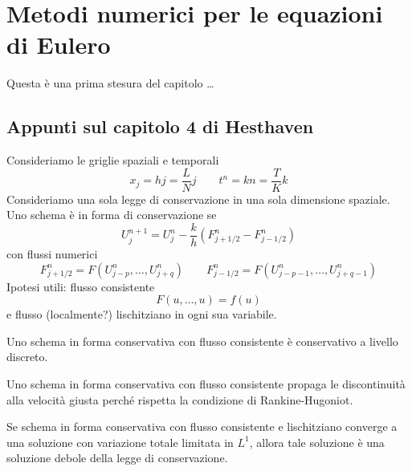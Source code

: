 \chapter{Metodi numerici per le equazioni di Eulero}

Questa è una prima stesura del capitolo \dots

\section{Appunti sul capitolo 4 di Hesthaven}

Consideriamo le griglie spaziali e temporali
\[
x_j = hj = \frac{L}{N}j
\qquad t^n = kn = \frac{T}{K}k
\]
Consideriamo una sola legge di conservazione in una sola dimensione spaziale.
Uno schema è in forma di conservazione se
\[
U_j^{n+1} = U_j^n - \frac{k}{h} (F_{j+1/2}^n - F_{j-1/2}^n)
\]
con flussi numerici
\[
F_{j+1/2}^n = F(U_{j-p}^n, \dots, U_{j+q}^n)
\qquad F_{j-1/2}^n = F(U_{j-p-1}^n, \dots, U_{j+q-1}^n)
\]
Ipotesi utili: flusso consistente
\[
F(u,\dots,u) = f(u)
\]
e flusso (localmente?) lischitziano in ogni sua variabile.

\begin{teor} Uno schema in forma conservativa con flusso consistente
è conservativo a livello discreto.
\end{teor}

\begin{coro} Uno schema in forma conservativa con flusso consistente
propaga le discontinuità alla velocità giusta perché rispetta la
condizione di Rankine-Hugoniot.
\end{coro}

\begin{teor} Se schema in forma conservativa con flusso consistente
e lischitziano converge a una soluzione con variazione totale limitata in $L^1$,
allora tale soluzione è una soluzione debole della legge di conservazione.
\end{teor}


